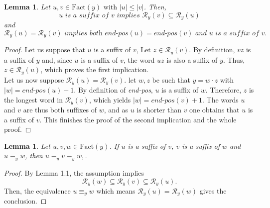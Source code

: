 \documentclass[11pt]{report}
\newtheorem{lemma}[theorem]{Lemma}
\begin{document}
\begin{lemma}
  Let \(u, v \in \text{Fact}(y) \text{ with } |u| \le |v|\). Then, $$u \textit{ is a suffix of } v \textit{ implies } \mathcal{R}_y(v) \subseteq \mathcal{R}_y(u)$$ and $$\mathcal{R}_y(u) =\mathcal{R}_y(v) \textit{ implies both end-pos}(u)=\textit{end-pos}(v) \textit{ and } u \textit{ is a suffix of } v.$$
\end{lemma}
\begin{proof}
  Let us suppose that $u$ is a suffix of $v$, Let $z \in
  \mathcal{R}_y(v)$. By definition, $vz$ is a suffix of $y$ and, since
  $u$ is a suffix of $v$, the word $uz$ is also a suffix of $y$. Thus,
  $z \in \mathcal{R}_y(u)$, which proves the first implication.\\
  Let us now suppose $\mathcal{R}_y(u) = \mathcal{R}_y(v)$. let $w, z$
  be such that $y = w \cdot z$ with $|w| = \textit{end-pos}(u) +
  1$. By definition of \textit{end-pos}, $u$ is a suffix of
  $w$. Therefore, $z$ is the longest word in $\mathcal{R}_y(v)$, which
  yields $|w| = \textit{end-pos}(v)+1$. The words $u$ and $v$ are thus
  both suffixes of $w$, and as $u$ is shorter than $v$ one obtains
  that $u$ is a suffix of $v$. This finishes the proof of the second
  implication and the whole proof.
\end{proof}



\begin{lemma}
  Let \(u, v, w \in \text{Fact}(y)\). If \(u\) is a suffix of \(v\),
  \(v\) is a suffix of \(w\) and \(u \equiv_y w\), then \(u \equiv_y v
  \equiv_y w, \).
\end{lemma}
\begin{proof}
  By Lemma 1.1, the assumption implies $$\mathcal{R}_y(w) \subseteq
  \mathcal{R}_y(v) \subseteq \mathcal{R}_y(u).$$ Then, the equivalence
  $u \equiv_y w$ which means $\mathcal{R}_y(u) = \mathcal{R}_y(w)$
  gives the conclusion.
\end{proof}
\end{document}
